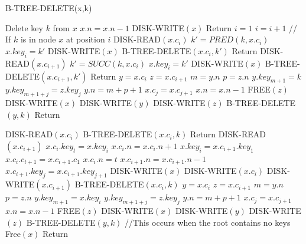 \documentclass{article}
\begin{document}
\begin{algorithm}
\caption{B-TREE-DELETE(x,k)}
\begin{algorithmic}[1]
			\STATE Delete key $k$ from $x$
			\STATE $x.n = x.n - 1$
			\STATE DISK-WRITE$(x)$
			\STATE Return
		\ENDIF
	\ENDFOR
\ENDIF
\STATE $i = 1$
	\STATE $i = i + 1$
\ENDWHILE
{} // If $k$ is in node $x$ at position $i$
	\STATE DISK-READ$(x.c_i)$
		\STATE $k' = PRED(k,x.c_i)$
		\STATE $x.key_i = k'$
		\STATE DISK-WRITE$(x)$
		\STATE B-TREE-DELETE$(x.c_i, k')$
		\STATE Return
	\STATE DISK-READ$(x.c_{i+1})$
		\STATE $k' = SUCC(k,x.c_i)$
		\STATE $x.key_i = k'$
		\STATE DISK-WRITE$(x)$
		\STATE B-TREE-DELETE$(x.c_{i+1}, k')$
		\STATE Return
	\Else
		\STATE $y = x.c_i$
		\STATE $z = x.c_{i+1}$
		\STATE $m = y.n$
		\STATE $p = z.n$
		\STATE $y.key_{m+1} = k$
			\STATE $y.key_{m+1+j} = z.key_j$
		\ENDFOR
		\STATE $y.n = m+p+1$
			\STATE $x.c_j = x.c_{j+1}$
		\ENDFOR
		\STATE $x.n = x.n - 1$
		\STATE FREE$(z)$
		\STATE DISK-WRITE$(x)$
		\STATE DISK-WRITE$(y)$
		\STATE DISK-WRITE$(z)$
		\STATE B-TREE-DELETE$(y,k)$
		\STATE Return
	\ENDIF
\ENDIF
{}
\end{algorithmic}
\end{algorithm}
\begin{algorithm}                     
\begin{algorithmic} [1]                  
\STATE DISK-READ$(x.c_i)$
	\STATE B-TREE-DELETE$(x.c_i,k)$
	\STATE Return
\STATE DISK-READ$(x.c_{i+1})$
	\STATE $x.c_i.key_t = x.key_i$
	\STATE $x.c_i.n = x.c_i.n + 1$
	\STATE $x.key_i = x.c_{i+1}.key_1$
	\STATE $x.c_i.c_{t+1} = x.c_{i+1}.c_1$
	\STATE $x.c_i.n = t$
	\STATE $x.c_{i+1}.n = x.c_{i+1}.n - 1$
		\STATE $x.c_{i+1}.key_j = x.c_{i+1}.key_{j+1}$
	\ENDFOR
	\STATE DISK-WRITE$(x)$
	\STATE DISK-WRITE$(x.c_i)$
	\STATE DISK-WRITE$(x.c_{i+1})$
	\STATE B-TREE-DELETE$(x.c_i, k)$
\Else
	\STATE $y = x.c_i$
	\STATE $z = x.c_{i+1}$
	\STATE $m = y.n$
	\STATE $p = z.n$
	\STATE $y.key_{m+1} = x.key_i$
		\STATE $y.key_{m+1+j} = z.key_j$
	\ENDFOR
	\STATE $y.n = m+p+1$
		\STATE $x.c_j = x.c_{j+1}$
	\ENDFOR
	\STATE $x.n = x.n - 1$
	\STATE FREE$(z)$
	\STATE DISK-WRITE$(x)$
	\STATE DISK-WRITE$(y)$
	\STATE DISK-WRITE$(z)$
	\STATE B-TREE-DELETE$(y,k)$
	 //This occurs when the root contains no keys
		\STATE Free$(x)$
	\ENDIF
	\STATE Return	
\ENDIF
\end{algorithmic}
\end{algorithm}
\end{document}
